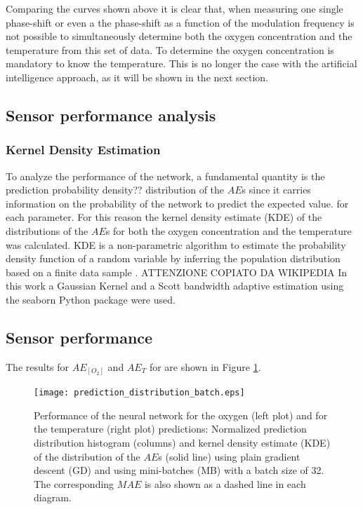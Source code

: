 \documentclass[9pt,twocolumn,twoside,pdftex]{optica}
\begin{document}
Comparing the curves shown above it is clear that, when measuring one single phase-shift or even a the phase-shift as a function of the modulation frequency is not possible to simultaneously determine both the oxygen concentration and the temperature from this set of data. To determine the oxygen concentration is mandatory to know the temperature. This is no longer the case with the artificial intelligence approach, as it will be shown in the next section. 

\subsection{Sensor performance analysis}

\subsubsection{Kernel Density Estimation}

To analyze the performance of the network, a fundamental quantity is the prediction probability density?? distribution of the $AE$s since it carries information on the probability of the network to predict the expected value.  for each parameter. For this reason the   kernel density estimate (KDE) of the distributions of the $AE$s for both the oxygen concentration and the temperature was calculated. KDE is a non-parametric algorithm to estimate the probability density function of a random variable by inferring the population distribution based on a finite data sample \cite{Hastie2009}. ATTENZIONE COPIATO DA WIKIPEDIA
In this work a Gaussian Kernel and a Scott bandwidth adaptive estimation \cite{Sain1996} using the seaborn Python package \cite{Waskom2020} were used.


\subsection{Sensor performance}


The results for $AE_{[O_2]}$ and $AE_T$ for are shown in Figure \ref{fig:prediction_distribution_batch_90}.

\begin{figure}[htbp]
\centering
\texttt{[image: prediction\_distribution\_batch.eps]}
\caption{Performance of the neural network for the oxygen (left plot) and for the temperature (right plot) predictions: Normalized prediction distribution histogram (columns) and kernel density estimate (KDE) of the distribution of the $AE$s (solid line) using plain gradient descent (GD) and using mini-batches (MB) with a batch size of 32. The corresponding $MAE$ is also shown as a dashed line in each diagram.}
\label{fig:prediction_distribution_batch_90}
\end{figure}
\end{document}

